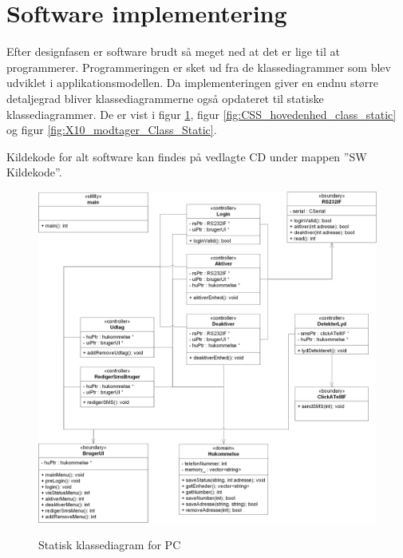 \section{Software implementering}

Efter designfasen er software brudt så meget ned at det er lige til at programmerer.
Programmeringen er sket ud fra de klassediagrammer som blev udviklet i applikationsmodellen.
Da implementeringen giver en endnu større detaljegrad bliver klassediagrammerne også opdateret til statiske klassediagrammer. De er vist i figur \ref{fig:PC_class_static}, figur \ref{fig:CSS_hovedenhed_class_static} og figur \ref{fig:X10_modtager_Class_Static}.

Kildekode for alt software kan findes på vedlagte CD under mappen ''SW Kildekode''.

\begin{figure}[htb]
  \centering
  {
    \includegraphics[width=\textwidth]	
      {billeder/uml/PC_Class_static}
  }
  \caption{Statisk klassediagram for PC}
  \label{fig:PC_class_static}
\end{figure}

